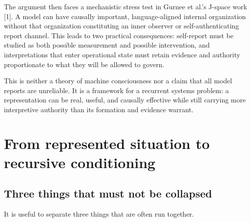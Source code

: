 \documentclass[12pt]{article}
\begin{document}
The argument then faces a mechanistic stress test in Gurnee et al.'s J-space work {[}1{]}. A model can have causally important, language-aligned internal organization without that organization constituting an inner observer or self-authenticating report channel. This leads to two practical consequences: self-report must be studied as both possible measurement and possible intervention, and interpretations that enter operational state must retain evidence and authority proportionate to what they will be allowed to govern.

This is neither a theory of machine consciousness nor a claim that all model reports are unreliable. It is a framework for a recurrent systems problem: a representation can be real, useful, and causally effective while still carrying more interpretive authority than its formation and evidence warrant.

\section{From represented situation to recursive conditioning}\label{from-represented-situation-to-recursive-conditioning}

\subsection{Three things that must not be collapsed}\label{three-things-that-must-not-be-collapsed}

It is useful to separate three things that are often run together.
\end{document}
